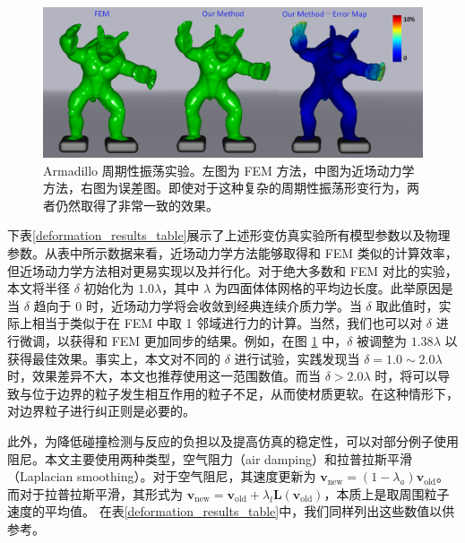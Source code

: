 \begin{figure}[!htb]
  \centering
  \captionsetup{justification=centering}
  \includegraphics[width=0.9\linewidth]{chap/image/demo_armadillo_vs_fem}

  \caption{\label{demo_armadillo_vs_fem}
           Armadillo 周期性振荡实验。左图为 FEM 方法，中图为近场动力学方法，右图为误差图。即使对于这种复杂的周期性振荡形变行为，两者仍然取得了非常一致的效果。
          }
\end{figure}

下表\ref{deformation_results_table}展示了上述形变仿真实验所有模型参数以及物理参数。从表中所示数据来看，近场动力学方法能够取得和 FEM 类似的计算效率，但近场动力学方法相对更易实现以及并行化。对于绝大多数和 FEM 对比的实验，本文将半径 $\delta$ 初始化为 $1.0\lambda$，其中 $\lambda$ 为四面体体网格的平均边长度。此举原因是当 $\delta$ 趋向于 0 时，近场动力学将会收敛到经典连续介质力学。当 $\delta$ 取此值时，实际上相当于类似于在 FEM 中取 1 邻域进行力的计算。当然，我们也可以对 $\delta$ 进行微调，以获得和 FEM 更加同步的结果。例如，在图 \ref{demo_armadillo_vs_fem} 中，$\delta$ 被调整为 $1.38\lambda$ 以获得最佳效果。事实上，本文对不同的 $\delta$ 进行试验，实践发现当 $\delta = 1.0\sim2.0 \lambda$ 时，效果差异不大，本文也推荐使用这一范围数值。而当 $\delta > 2.0 \lambda$ 时，将可以导致与位于边界的粒子发生相互作用的粒子不足，从而使材质更软。在这种情形下，对边界粒子进行纠正则是必要的。

此外，为降低碰撞检测与反应的负担以及提高仿真的稳定性，可以对部分例子使用阻尼。本文主要使用两种类型，空气阻力（air damping）和拉普拉斯平滑（Laplacian smoothing）。对于空气阻尼，其速度更新为 $\textbf{v}_{\mathrm{new}} = (1 - \lambda_{a})\textbf{v}_{\mathrm{old}}$。而对于拉普拉斯平滑，其形式为 $\textbf{v}_{\mathrm{new}} = \textbf{v}_{\mathrm{old}}+ \lambda_l\textbf{L}(\textbf{v}_\mathrm{old})$，本质上是取周围粒子速度的平均值。 在表\ref{deformation_results_table}中，我们同样列出这些数值以供参考。


